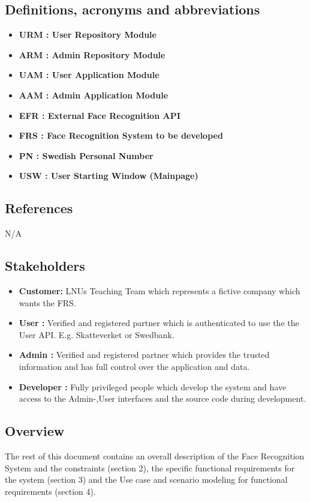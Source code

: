 \documentclass[a4paper,11pt]{article}
\begin{document}
\subsection{Definitions, acronyms and abbreviations}
\begin{itemize}
\item \textbf{URM : User Repository Module}
\item \textbf{ARM : Admin Repository Module}
\item \textbf{UAM : User Application Module}
\item \textbf{AAM : Admin Application Module}
\item \textbf{EFR : External Face Recognition API}
\item \textbf{FRS : Face Recognition System to be developed}
\item \textbf{PN : Swedish Personal Number}
\item \textbf{USW : User Starting Window (Mainpage)}
\end{itemize}

\subsection{References}
N/A
\subsection{Stakeholders} \label{Roles}
\begin{itemize}
\item \textbf{Customer: } LNUs Teaching Team which represents a fictive company which wants the FRS.
\item \textbf{User :} Verified and registered partner which is authenticated to use the the User API. E.g. Skatteverket or Swedbank.
\item \textbf{Admin :} Verified and registered partner which provides the trusted information and has full control over the application and data.
\item \textbf{Developer :} Fully privileged people which develop the system and have access to the Admin-,User interfaces and the source code during development.
\end{itemize}

\subsection{Overview}
The rest of this document contains an overall description of the Face Recognition System and the constraints (section 2), the specific functional requirements for the system (section 3) and the Use case and scenario modeling for functional requirements (section 4).
\end{document}
